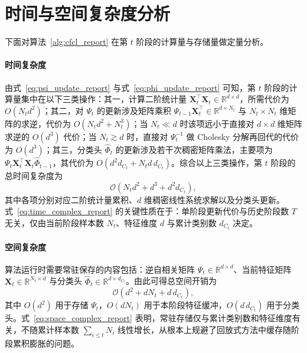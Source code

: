 \section{时间与空间复杂度分析}

下面对算法~\ref{alg:cfcl_report} 在第 $t$ 阶段的计算量与存储量做定量分析。

\paragraph{时间复杂度} 由式~\eqref{eq:psi_update_report} 与式~\eqref{eq:phi_update_report} 可知，第 $t$ 阶段的计算量集中在以下三类操作：其一，计算二阶统计量 $\mathbf{X}_t^\top\mathbf{X}_t\in\mathbb{R}^{d\times d}$，所需代价为 $O(N_t d^2)$；其二，对 $\Psi_t$ 的更新涉及矩阵乘积 $\Psi_{t-1}\mathbf{X}_t^\top\in\mathbb{R}^{d\times N_t}$ 与 $N_t\times N_t$ 维矩阵的求逆，代价为 $O(N_t d^2+N_t^3)$；当 $N_t\ll d$ 时该项远小于直接对 $d\times d$ 维矩阵求逆的 $O(d^3)$ 代价；当 $N_t\gtrsim d$ 时，直接对 $\Psi_t^{-1}$ 做 Cholesky 分解再回代的代价为 $O(d^3)$；其三，分类头 $\widehat{\Phi}_t$ 的更新涉及若干次稠密矩阵乘法，主要项为 $\Psi_t\mathbf{X}_t^\top\mathbf{X}_t\widehat{\Phi}_{t-1}$，其代价为 $O(d^2 d_{C_t}+N_t d\,d_{C_t})$。综合以上三类操作，第 $t$ 阶段的总时间复杂度为
\begin{equation}
\mathcal{O}\!\left(N_t d^2 + d^3 + d^2 d_{C_t}\right),
\label{eq:time_complex_report}
\end{equation}
其中各项分别对应二阶统计量累积、$d$ 维稠密线性系统求解以及分类头更新。式~\eqref{eq:time_complex_report} 的关键性质在于：单阶段更新代价与历史阶段数 $T$ 无关，仅由当前阶段样本数 $N_t$、特征维度 $d$ 与累计类别数 $d_{C_t}$ 决定。

\paragraph{空间复杂度} 算法运行时需要常驻保存的内容包括：逆自相关矩阵 $\Psi_t\in\mathbb{R}^{d\times d}$、当前特征矩阵 $\mathbf{X}_t\in\mathbb{R}^{N_t\times d}$ 与分类头 $\widehat{\Phi}_t\in\mathbb{R}^{d\times d_{C_t}}$。由此可得总空间开销为
\begin{equation}
\mathcal{O}\!\left(d^2 + d N_t + d\,d_{C_t}\right),
\label{eq:space_complex_report}
\end{equation}
其中 $O(d^2)$ 用于存储 $\Psi_t$，$O(d N_t)$ 用于本阶段特征缓冲，$O(d\,d_{C_t})$ 用于分类头。式~\eqref{eq:space_complex_report} 表明，常驻存储仅与累计类别数和特征维度有关，不随累计样本数 $\sum_{i\le t} N_i$ 线性增长，从根本上规避了回放式方法中缓存随阶段累积膨胀的问题。



